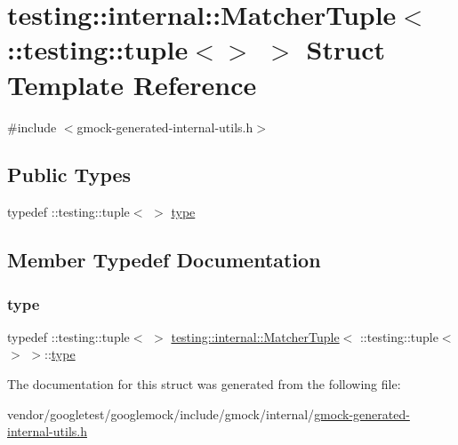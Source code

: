 \hypertarget{structtesting_1_1internal_1_1_matcher_tuple_3_01_1_1testing_1_1tuple_3_4_01_4}{}\section{testing\+:\+:internal\+:\+:Matcher\+Tuple$<$ \+:\+:testing\+:\+:tuple$<$$>$ $>$ Struct Template Reference}
\label{structtesting_1_1internal_1_1_matcher_tuple_3_01_1_1testing_1_1tuple_3_4_01_4}


{\ttfamily \#include $<$gmock-\/generated-\/internal-\/utils.\+h$>$}

\subsection*{Public Types}
\begin{DoxyCompactItemize}
\item 
typedef \+::testing\+::tuple$<$ $>$ \hyperlink{structtesting_1_1internal_1_1_matcher_tuple_3_01_1_1testing_1_1tuple_3_4_01_4_a8d4493b2b299322e6c885dee5473ebd7}{type}
\end{DoxyCompactItemize}


\subsection{Member Typedef Documentation}
\mbox{\label{structtesting_1_1internal_1_1_matcher_tuple_3_01_1_1testing_1_1tuple_3_4_01_4_a8d4493b2b299322e6c885dee5473ebd7}} 
\subsubsection{\texorpdfstring{type}{type}}
{\footnotesize\ttfamily typedef \+::testing\+::tuple$<$ $>$ \hyperlink{structtesting_1_1internal_1_1_matcher_tuple}{testing\+::internal\+::\+Matcher\+Tuple}$<$ \+::testing\+::tuple$<$$>$ $>$\+::\hyperlink{structtesting_1_1internal_1_1_matcher_tuple_3_01_1_1testing_1_1tuple_3_4_01_4_a8d4493b2b299322e6c885dee5473ebd7}{type}}



The documentation for this struct was generated from the following file\+:\begin{DoxyCompactItemize}
\item 
vendor/googletest/googlemock/include/gmock/internal/\hyperlink{gmock-generated-internal-utils_8h}{gmock-\/generated-\/internal-\/utils.\+h}\end{DoxyCompactItemize}
